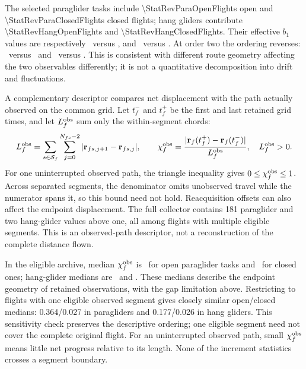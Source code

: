 The selected paraglider tasks include \num{\StatRevParaOpenFlights} open and
\num{\StatRevParaClosedFlights} closed flights; hang gliders contribute
\num{\StatRevHangOpenFlights} and \num{\StatRevHangClosedFlights}. Their effective
$b_1$ values are respectively \StatRevParaOpenAlphaOne\ versus
\StatRevParaClosedAlphaOne, and \StatRevHangOpenAlphaOne\ versus
\StatRevHangClosedAlphaOne. At order two the ordering reverses:
\StatRevParaOpenAlphaTwo\ versus \StatRevParaClosedAlphaTwo\ and
\StatRevHangOpenAlphaTwo\ versus \StatRevHangClosedAlphaTwo. This is consistent with
different route geometry affecting the two observables differently; it is not a
quantitative decomposition into drift and fluctuations.

A complementary descriptor compares net displacement with the path actually
observed on the common grid. Let $t_f^-$ and $t_f^+$ be the first and last retained
grid times, and let $L_f^{\rm obs}$ sum only the within-segment chords:
\begin{equation}
 L_f^{\rm obs}=\sum_{s\in\mathcal S_f}\sum_{j=0}^{N_{fs}-2}
       |\mathbf r_{fs,j+1}-\mathbf r_{fs,j}|,\qquad
 \chi_f^{\rm obs}=\frac{|\mathbf r_f(t_f^+)-\mathbf r_f(t_f^-)|}
                         {L_f^{\rm obs}},\quad L_f^{\rm obs}>0.
 \label{eq:closure-ratio}
\end{equation}
For one uninterrupted observed path, the triangle inequality gives
$0\le\chi_f^{\rm obs}\le1$. Across separated segments, the denominator omits
unobserved travel while the numerator spans it, so this bound need not hold.
Reacquisition offsets can also affect the endpoint displacement. The full collector
contains \num{181} paraglider and two hang-glider values above one, all among
flights with multiple eligible segments. This is an observed-path descriptor,
not a reconstruction of the complete distance flown.

In the eligible archive, median $\chi_f^{\rm obs}$ is
\StatRevParaOpenClosure\ for open paraglider tasks and
\StatRevParaClosedClosure\ for closed ones; hang-glider medians are
\StatRevHangOpenClosure\ and \StatRevHangClosedClosure. These medians describe
the endpoint geometry of retained observations, with the gap limitation above.
Restricting to flights with one eligible observed segment gives closely similar
open/closed medians: 0.364/0.027 in paragliders and 0.177/0.026 in hang gliders.
This sensitivity check preserves the descriptive ordering; one eligible segment
need not cover the complete original flight. For an uninterrupted observed path,
small $\chi_f^{\rm obs}$ means little net progress relative to its length.
None of the increment statistics crosses a segment boundary.

